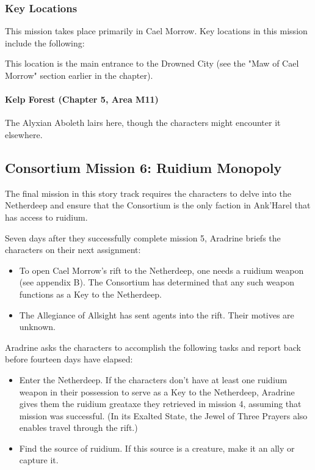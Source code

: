 \documentclass[10pt,a4paper,twoside,bg=print,twocolumn,openany,nodeprecatedcode]{dndbook}
\begin{document}
\subsubsection{Key Locations}
This mission takes place primarily in Cael Morrow. Key locations in this mission include the following:


\begin{description}[nolistsep]
\item[Maw of Cael Morrow.]
This location is the main entrance to the Drowned City (see the "Maw of Cael Morrow" section earlier in the chapter).
\end{description}

\paragraph{Kelp Forest (Chapter 5, Area M11)}
The Alyxian Aboleth lairs here, though the characters might encounter it elsewhere.

\subsection{Consortium Mission 6: Ruidium Monopoly}
The final mission in this story track requires the characters to delve into the Netherdeep and ensure that the Consortium is the only faction in Ank'Harel that has access to ruidium.

Seven days after they successfully complete mission 5, Aradrine briefs the characters on their next assignment:


\begin{itemize}
\item To open Cael Morrow's rift to the Netherdeep, one needs a ruidium weapon (see appendix B). The Consortium has determined that any such weapon functions as a Key to the Netherdeep.
\item The Allegiance of Allsight has sent agents into the rift. Their motives are unknown.
\end{itemize}

Aradrine asks the characters to accomplish the following tasks and report back before fourteen days have elapsed:


\begin{itemize}
\item Enter the Netherdeep. If the characters don't have at least one ruidium weapon in their possession to serve as a Key to the Netherdeep, Aradrine gives them the ruidium greataxe they retrieved in mission 4, assuming that mission was successful. (In its Exalted State, the Jewel of Three Prayers also enables travel through the rift.)
\item Find the source of ruidium. If this source is a creature, make it an ally or capture it.
\end{itemize}
\end{document}
